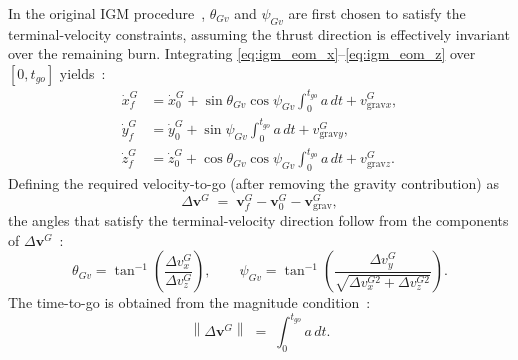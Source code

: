 In the original IGM procedure~\cite{ChandlerSmith1967IterativeGuidanceMode}, $\theta_{Gv}$ and $\psi_{Gv}$ are first chosen to satisfy the terminal-velocity constraints, assuming the thrust direction is effectively invariant over the remaining burn. Integrating \eqref{eq:igm_eom_x}--\eqref{eq:igm_eom_z} over $[0,t_{go}]$ yields~\cite{SONG2015463}:
\begin{align}
\dot{x}_f^{G} &= \dot{x}_0^{G} + \sin\theta_{Gv}\cos\psi_{Gv}\int_{0}^{t_{go}} a\,dt + v_{\mathrm{grav}x}^{G},
\label{eq:igm_vf_x}\\
\dot{y}_f^{G} &= \dot{y}_0^{G} + \sin\psi_{Gv}\int_{0}^{t_{go}} a\,dt + v_{\mathrm{grav}y}^{G},
\label{eq:igm_vf_y}\\
\dot{z}_f^{G} &= \dot{z}_0^{G} + \cos\theta_{Gv}\cos\psi_{Gv}\int_{0}^{t_{go}} a\,dt + v_{\mathrm{grav}z}^{G}.
\label{eq:igm_vf_z}
\end{align}
Defining the required velocity-to-go (after removing the gravity contribution) as~\cite{SONG2015463}
\begin{equation}
\Delta\mathbf{v}^{G} \;=\; \mathbf{v}_f^{G} - \mathbf{v}_0^{G} - \mathbf{v}_{\mathrm{grav}}^{G},
\label{eq:igm_dv}
\end{equation}
the angles that satisfy the terminal-velocity direction follow from the components of $\Delta\mathbf{v}^{G}$~\cite{SONG2015463}:
\begin{equation}
\theta_{Gv}=\tan^{-1}\!\left(\frac{\Delta v_x^{G}}{\Delta v_z^{G}}\right),
\qquad
\psi_{Gv}=\tan^{-1}\!\left(\frac{\Delta v_y^{G}}{\sqrt{\Delta v_x^{G2}+\Delta v_z^{G2}}}\right).
\label{eq:igm_angles_v}
\end{equation}
The time-to-go is obtained from the magnitude condition~\cite{SONG2015463}:
\begin{equation}
\left\lVert \Delta\mathbf{v}^{G} \right\rVert \;=\; \int_{0}^{t_{go}} a\,dt.
\label{eq:igm_tgo}
\end{equation}

